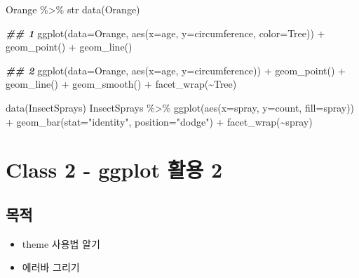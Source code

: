 \documentclass[
]{book}
\newenvironment{Shaded}{\begin{snugshade}}{\end{snugshade}}
\newcommand{\AttributeTok}[1]{\textcolor[rgb]{0.77,0.63,0.00}{#1}}
\newcommand{\DocumentationTok}[1]{\textcolor[rgb]{0.56,0.35,0.01}{\textbf{\textit{#1}}}}
\newcommand{\FunctionTok}[1]{\textcolor[rgb]{0.00,0.00,0.00}{#1}}
\newcommand{\NormalTok}[1]{#1}
\newcommand{\SpecialCharTok}[1]{\textcolor[rgb]{0.00,0.00,0.00}{#1}}
\newcommand{\StringTok}[1]{\textcolor[rgb]{0.31,0.60,0.02}{#1}}
\providecommand{\tightlist}{%
  \setlength{\itemsep}{0pt}\setlength{\parskip}{0pt}}
\begin{document}
\begin{Shaded}
\begin{Highlighting}[]
\NormalTok{Orange }\SpecialCharTok{\%\textgreater{}\%}\NormalTok{ str}
\FunctionTok{data}\NormalTok{(Orange)}


\DocumentationTok{\#\# 1}
\FunctionTok{ggplot}\NormalTok{(}\AttributeTok{data=}\NormalTok{Orange, }
       \FunctionTok{aes}\NormalTok{(}\AttributeTok{x=}\NormalTok{age, }\AttributeTok{y=}\NormalTok{circumference, }\AttributeTok{color=}\NormalTok{Tree)) }\SpecialCharTok{+}
  \FunctionTok{geom\_point}\NormalTok{() }\SpecialCharTok{+}
  \FunctionTok{geom\_line}\NormalTok{()}

\DocumentationTok{\#\# 2}
\FunctionTok{ggplot}\NormalTok{(}\AttributeTok{data=}\NormalTok{Orange, }
       \FunctionTok{aes}\NormalTok{(}\AttributeTok{x=}\NormalTok{age, }\AttributeTok{y=}\NormalTok{circumference)) }\SpecialCharTok{+}
  \FunctionTok{geom\_point}\NormalTok{() }\SpecialCharTok{+} 
  \FunctionTok{geom\_line}\NormalTok{() }\SpecialCharTok{+}
  \FunctionTok{geom\_smooth}\NormalTok{() }\SpecialCharTok{+}
  \FunctionTok{facet\_wrap}\NormalTok{(}\SpecialCharTok{\textasciitilde{}}\NormalTok{Tree)}

\FunctionTok{data}\NormalTok{(InsectSprays)}
\NormalTok{InsectSprays }\SpecialCharTok{\%\textgreater{}\%} 
  \FunctionTok{ggplot}\NormalTok{(}\FunctionTok{aes}\NormalTok{(}\AttributeTok{x=}\NormalTok{spray, }\AttributeTok{y=}\NormalTok{count, }\AttributeTok{fill=}\NormalTok{spray)) }\SpecialCharTok{+}
  \FunctionTok{geom\_bar}\NormalTok{(}\AttributeTok{stat=}\StringTok{"identity"}\NormalTok{,}
           \AttributeTok{position=}\StringTok{"dodge"}\NormalTok{) }\SpecialCharTok{+}
  \FunctionTok{facet\_wrap}\NormalTok{(}\SpecialCharTok{\textasciitilde{}}\NormalTok{spray) }
\end{Highlighting}
\end{Shaded}

\hypertarget{day2_class2}{%
\section{Class 2 - ggplot 활용 2}\label{day2_class2}}

\hypertarget{day2_class2_objectives}{%
\subsection{목적}\label{day2_class2_objectives}}

\begin{itemize}
\tightlist
\item
  theme 사용법 알기
\item
  에러바 그리기
\end{itemize}
\end{document}
